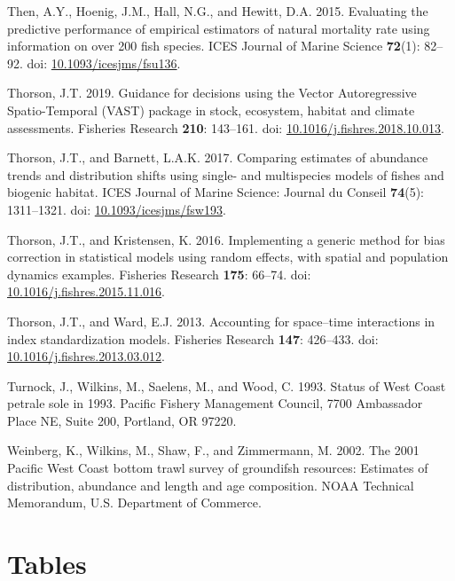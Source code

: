 \documentclass[12pt,]{article}
\begin{document}
\hypertarget{ref-then_evaluating_2015}{}
Then, A.Y., Hoenig, J.M., Hall, N.G., and Hewitt, D.A. 2015. Evaluating
the predictive performance of empirical estimators of natural mortality
rate using information on over 200 fish species. ICES Journal of Marine
Science \textbf{72}(1): 82--92. doi:
\href{https://doi.org/10.1093/icesjms/fsu136}{10.1093/icesjms/fsu136}.

\hypertarget{ref-thorson_guidance_2019}{}
Thorson, J.T. 2019. Guidance for decisions using the Vector
Autoregressive Spatio-Temporal (VAST) package in stock, ecosystem,
habitat and climate assessments. Fisheries Research \textbf{210}:
143--161. doi:
\href{https://doi.org/10.1016/j.fishres.2018.10.013}{10.1016/j.fishres.2018.10.013}.

\hypertarget{ref-thorson_comparing_2017}{}
Thorson, J.T., and Barnett, L.A.K. 2017. Comparing estimates of
abundance trends and distribution shifts using single- and multispecies
models of fishes and biogenic habitat. ICES Journal of Marine Science:
Journal du Conseil \textbf{74}(5): 1311--1321. doi:
\href{https://doi.org/10.1093/icesjms/fsw193}{10.1093/icesjms/fsw193}.

\hypertarget{ref-thorson_implementing_2016}{}
Thorson, J.T., and Kristensen, K. 2016. Implementing a generic method
for bias correction in statistical models using random effects, with
spatial and population dynamics examples. Fisheries Research
\textbf{175}: 66--74. doi:
\href{https://doi.org/10.1016/j.fishres.2015.11.016}{10.1016/j.fishres.2015.11.016}.

\hypertarget{ref-thorson_accounting_2013}{}
Thorson, J.T., and Ward, E.J. 2013. Accounting for space--time
interactions in index standardization models. Fisheries Research
\textbf{147}: 426--433. doi:
\href{https://doi.org/10.1016/j.fishres.2013.03.012}{10.1016/j.fishres.2013.03.012}.

\hypertarget{ref-turnock_status_1993}{}
Turnock, J., Wilkins, M., Saelens, M., and Wood, C. 1993. Status of West
Coast petrale sole in 1993. Pacific Fishery Management Council, 7700
Ambassador Place NE, Suite 200, Portland, OR 97220.

\hypertarget{ref-weinberg_2001_2002}{}
Weinberg, K., Wilkins, M., Shaw, F., and Zimmermann, M. 2002. The 2001
Pacific West Coast bottom trawl survey of groundifsh resources:
Estimates of distribution, abundance and length and age composition.
NOAA Technical Memorandum, U.S. Department of Commerce.

\newpage

\section{Tables}\label{tables}
\end{document}
